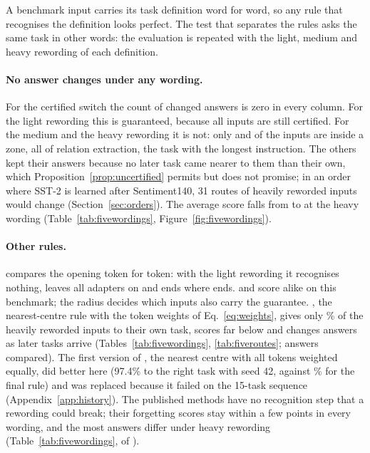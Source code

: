 A benchmark input carries its task definition word for word, so any rule that recognises the
definition looks perfect. The test that separates the rules asks the same task in other
words: the evaluation is repeated with the light, medium and heavy rewording of each definition.

\paragraph{No answer changes under any wording.} For the certified switch the count of changed answers is zero in every column. For the light rewording this is guaranteed, because all \FiveCertZoneOneLight{} inputs are
still certified. For the medium and the heavy rewording it is not: only \FiveCertZoneOneMedium{} and \FiveCertZoneOneHeavy{} of the \FiveCertInputsOne{}
inputs are inside a zone, all of relation extraction, the task with the longest instruction. The others kept their answers because no later task came nearer to them than
their own, which Proposition~\ref{prop:uncertified} permits but does not
promise; in an order where SST-2 is learned after
Sentiment140, 31 routes of heavily reworded inputs would change (Section~\ref{sec:orders}). The average
score falls from \FiveCertAP{} to \FiveCertAPHeavy{} at the heavy wording (Table~\ref{tab:fivewordings}, Figure~\ref{fig:fivewordings}).

\paragraph{Other rules.} \keyswitch{} compares the opening token for token: with the light rewording it recognises nothing, leaves
all adapters on and ends where \plain{} ends. \nearest{} and \cert{} score alike on this benchmark; the radius decides which inputs also carry the guarantee. \centre{}, the nearest-centre rule with the token weights of Eq.~\eqref{eq:weights}, gives only
\FiveCentreRightHeavy{}\% of the heavily reworded inputs to their own task, scores far below \cert{} and
changes answers as later tasks arrive (Tables~\ref{tab:fivewordings}, \ref{tab:fiveroutes}; \FiveCentreComparedHeavy{} answers compared). The first version of \cert{}, the nearest centre
with all tokens weighted equally, did better here (97.4\% to the right task with seed 42, against
\FiveCertRightHeavy{}\% for the final rule) and was replaced because it failed on the 15-task sequence (Appendix~\ref{app:history}). The published methods have no recognition step that a rewording could break; their forgetting scores stay within a few points in every wording, and the most answers differ under heavy rewording (Table~\ref{tab:fivewordings}, of \FiveInfComparedHeavy{}).

